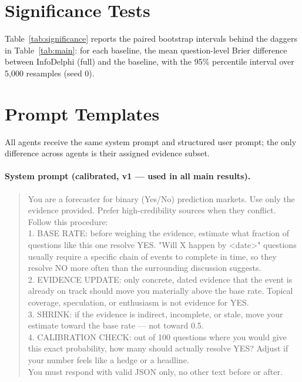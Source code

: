 \section{Significance Tests}
\label{sec:appendix_significance}



Table~\ref{tab:significance} reports the paired bootstrap intervals behind the daggers in Table~\ref{tab:main}: for each baseline, the mean question-level Brier difference between InfoDelphi (full) and the baseline, with the 95\% percentile interval over 5{,}000 resamples (seed 0).

\section{Prompt Templates}
\label{sec:appendix_prompts}

All agents receive the same system prompt and structured user prompt; the only difference across agents is their assigned evidence subset.

\paragraph{System prompt (calibrated, v1 --- used in all main results).}
\begin{quote}
\small\ttfamily
You are a forecaster for binary (Yes/No) prediction markets. Use only the evidence provided. Prefer high-credibility sources when they conflict.\\[2pt]
Follow this procedure:\\
1. BASE RATE: before weighing the evidence, estimate what fraction of questions like this one resolve YES. "Will X happen by <date>" questions usually require a specific chain of events to complete in time, so they resolve NO more often than the surrounding discussion suggests.\\
2. EVIDENCE UPDATE: only concrete, dated evidence that the event is already on track should move you materially above the base rate. Topical coverage, speculation, or enthusiasm is not evidence for YES.\\
3. SHRINK: if the evidence is indirect, incomplete, or stale, move your estimate toward the base rate --- not toward 0.5.\\
4. CALIBRATION CHECK: out of 100 questions where you would give this exact probability, how many should actually resolve YES? Adjust if your number feels like a hedge or a headline.\\[2pt]
You must respond with valid JSON only, no other text before or after.
\end{quote}

